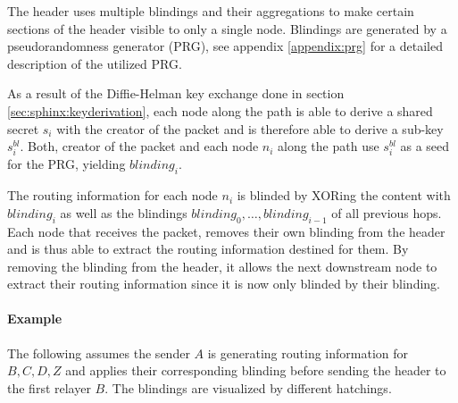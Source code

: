 The header uses multiple blindings and their aggregations to make certain sections of the header visible to only a single node. Blindings are generated by a pseudorandomness generator (PRG), see appendix \ref{appendix:prg} for a detailed description of the utilized PRG.

As a result of the Diffie-Helman key exchange done in section \ref{sec:sphinx:keyderivation}, each node along the path is able to derive a shared secret $s_i$ with the creator of the packet and is therefore able to derive a sub-key $s_i^{bl}$. Both, creator of the packet and each node $n_i$ along the path use $s_i^{bl}$ as a seed for the PRG, yielding $blinding_i$.

The routing information for each node $n_i$ is blinded by XORing the content with $blinding_i$ as well as the blindings $blinding_0, \dots , blinding_{i-1}$ of all previous hops. Each node that receives the packet, removes their own blinding from the header and is thus able to extract the routing information destined for them. By removing the blinding from the header, it allows the next downstream node to extract their routing information since it is now only blinded by their blinding.

\paragraph{Example}

The following assumes the sender $A$ is generating routing information for $B,C,D,Z$ and applies their corresponding blinding before sending the header to the first relayer $B$. The blindings are visualized by different hatchings.

